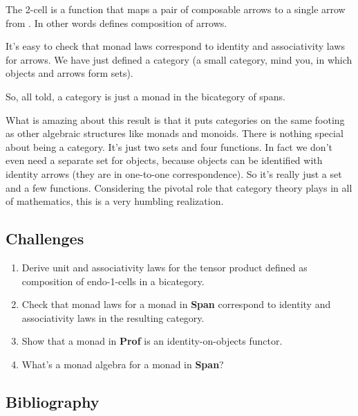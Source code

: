 The 2-cell  is a function that maps a pair of composable
arrows  to a single arrow  from
. In other words  defines composition of arrows.

It's easy to check that monad laws correspond to identity and
associativity laws for arrows. We have just defined a category (a small
category, mind you, in which objects and arrows form sets).

So, all told, a category is just a monad in the bicategory of spans.

What is amazing about this result is that it puts categories on the same
footing as other algebraic structures like monads and monoids. There is
nothing special about being a category. It's just two sets and four
functions. In fact we don't even need a separate set for objects,
because objects can be identified with identity arrows (they are in
one-to-one correspondence). So it's really just a set and a few
functions. Considering the pivotal role that category theory plays in
all of mathematics, this is a very humbling realization.

\subsection{Challenges}\label{challenges}

\begin{enumerate}
\tightlist
\item
  Derive unit and associativity laws for the tensor product defined as
  composition of endo-1-cells in a bicategory.
\item
  Check that monad laws for a monad in \textbf{Span} correspond to
  identity and associativity laws in the resulting category.
\item
  Show that a monad in \textbf{Prof} is an identity-on-objects functor.
\item
  What's a monad algebra for a monad in \textbf{Span}?
\end{enumerate}

\subsection{Bibliography}\label{bibliography}

